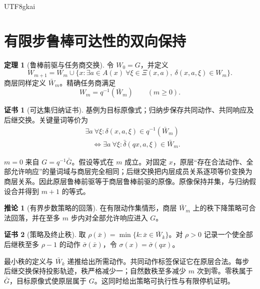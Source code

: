 \documentclass[12pt]{report}
\makeatletter
\theoremstyle{definition}
\newtheorem{theorem}{定理}[chapter]
\newtheorem{corollary}{推论}[chapter]
\newtheorem{Certificate}{证书}[chapter]
\renewenvironment{proof}[1][\proofname]{\par
  \pushQED{\qed}\normalfont
  \topsep6\p@\@plus6\p@\relax
  \trivlist
  \item[\hskip\labelsep\normalfont #1\@addpunct{.}]\ignorespaces
}{
  \popQED\endtrivlist\@endpefalse
}
\makeatother
\begin{document}
\begin{CJK*}{UTF8}{gkai}
\section{有限步鲁棒可达性的双向保持}
\begin{theorem}[鲁棒前驱与任务商交换]
\label{thm:reach}
令 \(W_0=G\)，并定义
\[
W_{m+1}=W_m\cup\{x:\exists a\in A(x)\ \forall\xi\in\Xi(x,a),\ \delta(x,a,\xi)\in W_m\}.
\]
商层同样定义 \(\bar W_m\)。精确任务商满足
\[
W_m=q^{-1}(\bar W_m)\qquad(m\ge0).
\]
\end{theorem}
\begin{Certificate}[可达集归纳证书]
基例为目标原像式；归纳步保存共同动作、共同响应及后继交换。关键量词等价为
\[
\begin{aligned}
&\exists a\ \forall\xi:\delta(x,a,\xi)\in q^{-1}(\bar W_m)\\
&\quad\Longleftrightarrow\exists a\ \forall\xi:\bar\delta(qx,a,\xi)\in\bar W_m.
\end{aligned}
\]
\end{Certificate}
\begin{proof}
\(m=0\) 来自 \(G=q^{-1}\bar G\)。假设等式在 \(m\) 成立。对固定 \(x\)，原层“存在合法动作、全部允许响应”的量词域与商层完全相同；后继交换把内层成员关系逐项等价变换为商层关系。因此原层鲁棒前驱等于商层鲁棒前驱的原像。原像保持并集，与归纳假设合并得到 \(m+1\) 的等式。
\end{proof}

\begin{corollary}[有界步数策略的回落]
\label{cor:policy}
在有限动作集情形，商层 \(\bar W_m\) 上的秩下降策略可合法回落，并在至多 \(m\) 步内对全部允许响应进入 \(G\)。
\end{corollary}
\begin{Certificate}[策略及终止秩]
取 \(\rho(\bar x)=\min\{k:\bar x\in\bar W_k\}\)。对 \(\rho>0\) 记录一个使全部后继秩至多 \(\rho-1\) 的动作 \(\bar\sigma(\bar x)\)，令 \(\sigma(x)=\bar\sigma(qx)\)。
\end{Certificate}
\begin{proof}
最小秩的定义与 \(\bar W_k\) 递推给出所需动作。共同动作标签保证它在原层合法。每步后继交换保持投影轨迹，秩严格减少一；自然数秩至多减少 \(m\) 次到零。零秩属于 \(\bar G\)，目标原像式使原层属于 \(G\)。这同时给出策略可执行性与有限停机证明。
\end{proof}


\end{CJK*}
\end{document}
